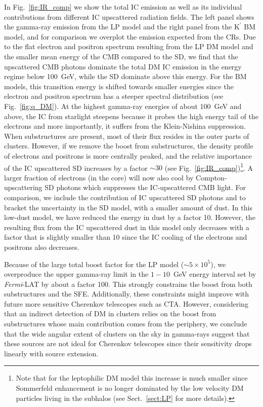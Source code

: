 \documentclass[10pt,aps,pra,reprint,amsmath,amsfonts,amssymb,showpacs,nofootinbib,floatfix]{revtex4-1}
\newcommand{\Fermi}{{\em Fermi}\xspace}
\newcommand{\rmn}{\mathrm}
\newcommand{\Kp}{\rmn{K}^\prime}
\begin{document}
In Fig.~\ref{fig:IR_comp} we show the total IC emission as well as its
individual contributions from different IC upscattered radiation
fields. The left panel shows the gamma-ray emission from the LP model
and the right panel from the $\Kp$ BM model, and for comparison we
overplot the emission expected from the CRs. Due to the flat electron
and positron spectrum resulting from the LP DM model and the smaller
mean energy of the CMB compared to the SD, we find that the
upscattered CMB photons dominate the total DM IC emission in the
energy regime below 100~GeV, while the SD dominate above this
energy. For the BM models, this transition energy is shifted towards
smaller energies since the electron and positron spectrum has a
steeper spectral distribution (see Fig.~\ref{fig:q_DM}). At the
highest gamma-ray energies of about 100~GeV and above, the IC from
starlight steepens because it probes the high energy tail of the
electrons and more importantly, it suffers from the Klein-Nishina
suppression. When substructures are present, most of their flux
resides in the outer parts of clusters. However, if we remove the
boost from substructures, the density profile of electrons and
positrons is more centrally peaked, and the relative importance of the
IC upscattered SD increases by a factor $\sim 30$ (see
Fig.~\ref{fig:IR_comp})\footnote{Note that for the leptophilic DM
  model this increase is much smaller since Sommerfeld enhancement is
  no longer dominated by the low velocity DM particles living in the
  subhalos (see Sect.~\ref{sect:LP} for more details).}. A larger
fraction of electrons (in the core) will now also cool by
Compton-upscattering SD photons which suppresses the IC-upscattered
CMB light. For comparison, we include the contribution of IC
upscattered SD photons and to bracket the uncertainty in the SD model,
with a smaller amount of dust. In this low-dust model, we have reduced
the energy in dust by a factor 10. However, the resulting flux from
the IC upscattered dust in this model only decreases with a factor
that is slightly smaller than 10 since the IC cooling of the electrons
and positrons also decreases.

Because of the large total boost factor for the LP model ($\sim5\times
10^5$), we overproduce the upper gamma-ray limit in the $1-10$~GeV
energy interval set by \Fermi-LAT by about a factor 100. This strongly
constrains the boost from both substructures and the
SFE. Additionally, these constraints might improve with future more
sensitive Cherenkov telescopes such as CTA. However, considering that
an indirect detection of DM in clusters relies on the boost from
substructures whose main contribution comes from the periphery, we
conclude that the wide angular extent of clusters on the sky in
gamma-rays suggest that these sources are not ideal for Cherenkov
telescopes since their sensitivity drops linearly with source
extension.
\end{document}

